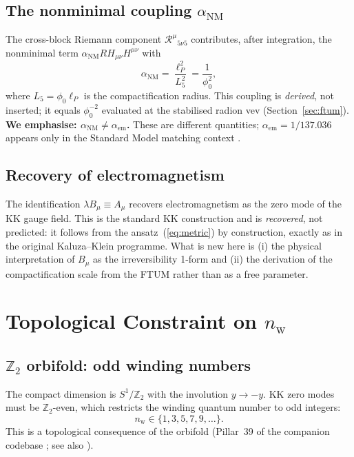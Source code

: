 \documentclass[12pt,a4paper]{article}
\newcommand{\nw}{n_{\mathrm{w}}}
\newcommand{\phiz}{\phi_0}
\newcommand{\lam}{\lambda}
\newcommand{\aNM}{\alpha_{\mathrm{NM}}}
\newcommand{\aem}{\alpha_{\mathrm{em}}}
\newcommand{\lP}{\ell_P}
\begin{document}
\subsection{The nonminimal coupling $\aNM$}

The cross-block Riemann component $\mathcal{R}^\mu{}_{5\nu5}$ contributes,
after integration, the nonminimal term $\aNM R H_{\mu\nu}H^{\mu\nu}$ with
\begin{equation}
  \aNM = \frac{\lP^2}{L_5^2} = \frac{1}{\phi_0^2} ,
  \label{eq:aNM}
\end{equation}
where $L_5=\phi_0\lP$ is the compactification radius.  This coupling is
\emph{derived}, not inserted; it equals $\phiz^{-2}$ evaluated at the
stabilised radion vev (Section~\ref{sec:ftum}).
\textbf{We emphasise: $\aNM \neq \aem$.}  These are different quantities;
$\aem=1/137.036$ appears only in the Standard Model matching context
\cite{PDG2022}.

\subsection{Recovery of electromagnetism}

The identification $\lam B_\mu \equiv A_\mu$ recovers electromagnetism as the
zero mode of the KK gauge field.  This is the standard KK construction and is
\emph{recovered}, not predicted: it follows from the ansatz~(\ref{eq:metric})
by construction, exactly as in the original Kaluza--Klein programme.  What is
new here is (i) the physical interpretation of $B_\mu$ as the irreversibility
1-form and (ii) the derivation of the compactification scale from the FTUM
rather than as a free parameter.

\section{Topological Constraint on $\nw$}
\label{sec:topology}

\subsection{$\mathbb{Z}_2$ orbifold: odd winding numbers}

The compact dimension is $S^1/\mathbb{Z}_2$ with the involution $y\to -y$.
KK zero modes must be $\mathbb{Z}_2$-even, which restricts the winding quantum
number to odd integers:
\begin{equation}
  \nw \in \{1,3,5,7,9,\ldots\} .
  \label{eq:z2}
\end{equation}
This is a topological consequence of the orbifold (Pillar~39 of the companion
codebase \cite{WalkerPearson2026}; see also \cite{Horava1996}).
\end{document}
